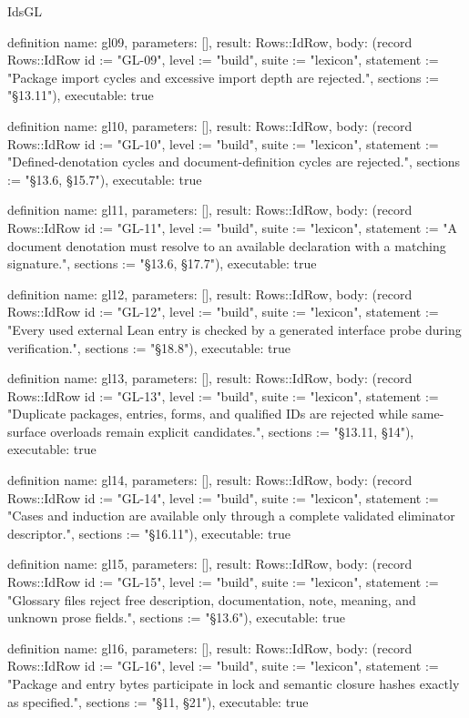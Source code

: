\begin{lexlean}{IdsGL}
\begin{semanticmodule}
definition{
  name: gl09,
  parameters: [],
  result: Rows::IdRow,
  body: (record Rows::IdRow {id := "GL-09", level := "build", suite := "lexicon", statement := "Package import cycles and excessive import depth are rejected.", sections := "§13.11"}),
  executable: true
}

definition{
  name: gl10,
  parameters: [],
  result: Rows::IdRow,
  body: (record Rows::IdRow {id := "GL-10", level := "build", suite := "lexicon", statement := "Defined-denotation cycles and document-definition cycles are rejected.", sections := "§13.6, §15.7"}),
  executable: true
}

definition{
  name: gl11,
  parameters: [],
  result: Rows::IdRow,
  body: (record Rows::IdRow {id := "GL-11", level := "build", suite := "lexicon", statement := "A document denotation must resolve to an available declaration with a matching signature.", sections := "§13.6, §17.7"}),
  executable: true
}

definition{
  name: gl12,
  parameters: [],
  result: Rows::IdRow,
  body: (record Rows::IdRow {id := "GL-12", level := "build", suite := "lexicon", statement := "Every used external Lean entry is checked by a generated interface probe during verification.", sections := "§18.8"}),
  executable: true
}

definition{
  name: gl13,
  parameters: [],
  result: Rows::IdRow,
  body: (record Rows::IdRow {id := "GL-13", level := "build", suite := "lexicon", statement := "Duplicate packages, entries, forms, and qualified IDs are rejected while same-surface overloads remain explicit candidates.", sections := "§13.11, §14"}),
  executable: true
}

definition{
  name: gl14,
  parameters: [],
  result: Rows::IdRow,
  body: (record Rows::IdRow {id := "GL-14", level := "build", suite := "lexicon", statement := "Cases and induction are available only through a complete validated eliminator descriptor.", sections := "§16.11"}),
  executable: true
}

definition{
  name: gl15,
  parameters: [],
  result: Rows::IdRow,
  body: (record Rows::IdRow {id := "GL-15", level := "build", suite := "lexicon", statement := "Glossary files reject free description, documentation, note, meaning, and unknown prose fields.", sections := "§13.6"}),
  executable: true
}

definition{
  name: gl16,
  parameters: [],
  result: Rows::IdRow,
  body: (record Rows::IdRow {id := "GL-16", level := "build", suite := "lexicon", statement := "Package and entry bytes participate in lock and semantic closure hashes exactly as specified.", sections := "§11, §21"}),
  executable: true
}


\end{semanticmodule}
\end{lexlean}
